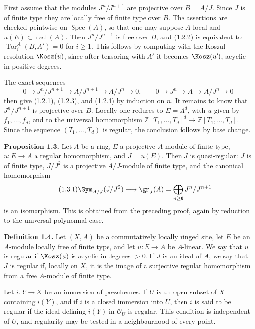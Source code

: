 \documentclass[11pt]{article}
\newcommand{\Tor}{\operatorname{Tor}}
\newcommand{\Spec}{\operatorname{Spec}}
\providecommand{\rad}{\operatorname{rad}}
\providecommand{\Tor}{\operatorname{Tor}}
\providecommand{\cO}{\mathcal O}
\begin{document}
First assume that the modules \(J^n/J^{n+1}\) are projective over \(B=A/J\). Since \(J\) is of finite type they are locally free of finite type over \(B\). The assertions are checked pointwise on \(\Spec(A)\), so that one may suppose \(A\) local and \(u(E)\subset\rad(A)\). Then \(J^n/J^{n+1}\) is free over \(B\), and (1.2.2) is equivalent to \(\Tor_i^A(B,A')=0\) for \(i\ge1\). This follows by computing with the Koszul resolution \(\Kosz(u)\), since after tensoring with \(A'\) it becomes \(\Kosz(u')\), acyclic in positive degrees.

The exact sequences
\[
0\to J^n/J^{n+1}\to A/J^{n+1}\to A/J^n\to0,
\qquad
0\to J^n\to A\to A/J^n\to0
\]
then give (1.2.1), (1.2.3), and (1.2.4) by induction on \(n\). It remains to know that \(J^n/J^{n+1}\) is projective over \(B\). Locally one reduces to \(E=A^d\), with \(u\) given by \(f_1,\ldots,f_d\), and to the universal homomorphism \(\mathbb Z[T_1,\ldots,T_d]^d\to \mathbb Z[T_1,\ldots,T_d]\). Since the sequence \((T_1,\ldots,T_d)\) is regular, the conclusion follows by base change.

\textbf{Proposition 1.3.} Let \(A\) be a ring, \(E\) a projective \(A\)-module of finite type, \(u:E\to A\) a regular homomorphism, and \(J=u(E)\). Then \(J\) is quasi-regular: \(J\) is of finite type, \(J/J^2\) is a projective \(A/J\)-module of finite type, and the canonical homomorphism
\begin{equation}\tag{1.3.1}
 \Sym_{A/J}(J/J^2)\longrightarrow \gr_J(A)=\bigoplus_{n\ge0}J^n/J^{n+1}
\end{equation}
is an isomorphism. This is obtained from the preceding proof, again by reduction to the universal polynomial case.

\textbf{Definition 1.4.} Let \((X,A)\) be a commutatively locally ringed site, let \(E\) be an \(A\)-module locally free of finite type, and let \(u:E\to A\) be \(A\)-linear. We say that \(u\) is regular if \(\Kosz(u)\) is acyclic in degrees \(>0\). If \(J\) is an ideal of \(A\), we say that \(J\) is regular if, locally on \(X\), it is the image of a surjective regular homomorphism from a free \(A\)-module of finite type.

Let \(i:Y\to X\) be an immersion of preschemes. If \(U\) is an open subset of \(X\) containing \(i(Y)\), and if \(i\) is a closed immersion into \(U\), then \(i\) is said to be regular if the ideal defining \(i(Y)\) in \(\cO_U\) is regular. This condition is independent of \(U\), and regularity may be tested in a neighbourhood of every point.
\end{document}
